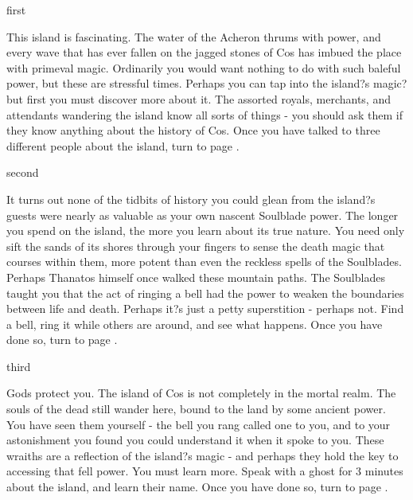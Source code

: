 \documentclass[greennotebook]{Kos}
\begin{document}

\startnotebook{\nButler{}}

\begin{page}{first}


This island is fascinating. The water of the Acheron thrums with power, and every wave that has ever fallen on the jagged stones of Cos has imbued the place with primeval magic. Ordinarily you would want nothing to do with such baleful power, but these are stressful times. Perhaps you can tap into the island?s magic? but first you must discover more about it. The assorted royals, merchants, and attendants wandering the island know all sorts of things - you should ask them if they know anything about the history of Cos. Once you have talked to three different people about the island, turn to page .


\end{page}

\begin{page}{second}

It turns out none of the tidbits of history you could glean from the island?s guests were nearly as valuable as your own nascent Soulblade power. The longer you spend on the island, the more you learn about its true nature. You need only sift the sands of its shores through your fingers to sense the death magic that courses within them, more potent than even the reckless spells of the Soulblades. Perhaps Thanatos himself once walked these mountain paths. The Soulblades taught you that the act of ringing a bell had the power to weaken the boundaries between life and death. Perhaps it?s just a petty superstition - perhaps not. Find a bell, ring it while others are around, and see what happens. Once you have done so, turn to page .

\end{page}

\begin{page}{third}

Gods protect you. The island of Cos is not completely in the mortal realm. The souls of the dead still wander here, bound to the land by some ancient power. You have seen them yourself - the bell you rang called one to you, and to your astonishment you found you could understand it when it spoke to you. These wraiths are a reflection of the island?s magic - and perhaps they hold the key to accessing that fell power. You must learn more. Speak with a ghost for 3 minutes about the island, and learn their name. Once you have done so, turn to page .

\end{page}
\end{document}
